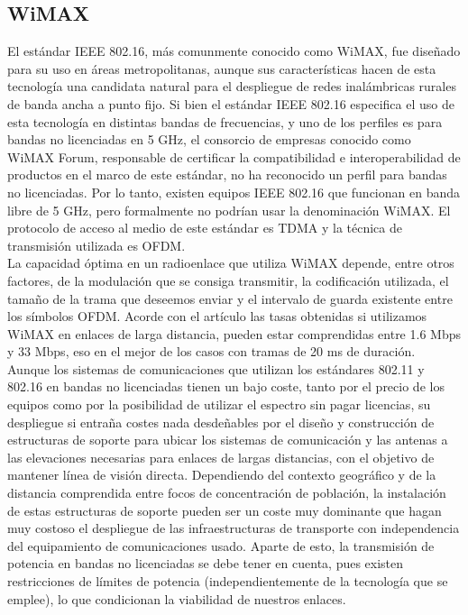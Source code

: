 \subsection{WiMAX}
El estándar IEEE 802.16, más comunmente conocido como WiMAX, fue diseñado para su uso en áreas metropolitanas, aunque sus características hacen de esta tecnología una candidata natural para el despliegue de redes inalámbricas rurales de banda ancha a punto fijo. Si bien el estándar IEEE 802.16 especifica el uso de esta tecnología en distintas bandas de frecuencias, y uno de los perfiles es para bandas no licenciadas en 5 GHz, el consorcio de empresas conocido como WiMAX Forum, responsable de certificar la compatibilidad e interoperabilidad de productos en el marco de este estándar, no ha reconocido un perfil para bandas no licenciadas. Por lo tanto, existen equipos IEEE 802.16 que funcionan en banda libre de 5 GHz, pero formalmente no podrían usar la denominación WiMAX. El protocolo de acceso al medio de este estándar es TDMA y la técnica de transmisión utilizada es OFDM.\\

La capacidad óptima en un radioenlace que utiliza WiMAX depende, entre otros factores, de la modulación que se consiga transmitir, la codificación utilizada, el tamaño de la trama que deseemos enviar y el intervalo de guarda existente entre los símbolos OFDM. Acorde con el artículo \cite{simo2014assessing} las tasas obtenidas si utilizamos WiMAX en enlaces de larga distancia, pueden estar comprendidas entre 1.6 Mbps y 33 Mbps, eso en el mejor de los casos con tramas de 20 ms de duración.\\
		
Aunque los sistemas de comunicaciones que utilizan los estándares 802.11 y 802.16 en bandas no licenciadas tienen un bajo coste, tanto por el precio de los equipos como por la posibilidad de utilizar el espectro sin pagar licencias, su despliegue si entraña costes nada desdeñables por el diseño y construcción de estructuras de soporte para ubicar los sistemas de comunicación y las antenas a las elevaciones necesarias para enlaces de largas distancias, con el objetivo de mantener línea de visión directa. Dependiendo del contexto geográfico y de la distancia comprendida entre focos de concentración de población, la instalación de estas estructuras de soporte pueden ser un coste muy dominante que hagan muy costoso el despliegue de las infraestructuras de transporte con independencia del equipamiento de comunicaciones usado. Aparte de esto, la transmisión de potencia en bandas no licenciadas se debe tener en cuenta, pues existen restricciones de límites de potencia (independientemente de la tecnología que se emplee), lo que condicionan la viabilidad de nuestros enlaces.

